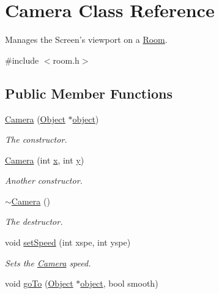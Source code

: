 \hypertarget{class_camera}{\section{Camera Class Reference}
\label{class_camera}
}


Manages the Screen's viewport on a \hyperlink{class_room}{Room}.  




{\ttfamily \#include $<$room.\-h$>$}

\subsection*{Public Member Functions}
\begin{DoxyCompactItemize}
\item 
\hyperlink{class_camera_adb0f46e5040f63b7a8451fa5ae5f9804}{Camera} (\hyperlink{class_object}{Object} $\ast$\hyperlink{class_camera_ad836de76be258c26164908b9a5caf770}{object})
\begin{DoxyCompactList}\small\item\em The constructor. \end{DoxyCompactList}\item 
\hyperlink{class_camera_a5ff2de9f0242f1284b559fe2704fdb6d}{Camera} (int \hyperlink{class_camera_ae270fbd3b09b36f240a2d55b3b5b9cec}{x}, int \hyperlink{class_camera_ab0522c72fc25c7fa9ad6d0b91e0a3270}{y})
\begin{DoxyCompactList}\small\item\em Another constructor. \end{DoxyCompactList}\item 
\hyperlink{class_camera_ad1897942d0ccf91052386388a497349f}{$\sim$\-Camera} ()
\begin{DoxyCompactList}\small\item\em The destructor. \end{DoxyCompactList}\item 
void \hyperlink{class_camera_afd0d3e5987d40ab95269281e3849f4f5}{set\-Speed} (int xspe, int yspe)
\begin{DoxyCompactList}\small\item\em Sets the \hyperlink{class_camera}{Camera} speed. \end{DoxyCompactList}\item 
void \hyperlink{class_camera_ae00cfccd0a6af0209baa5a815e5576d0}{go\-To} (\hyperlink{class_object}{Object} $\ast$\hyperlink{class_camera_ad836de76be258c26164908b9a5caf770}{object}, bool smooth)

\end{DoxyCompactItemize}
